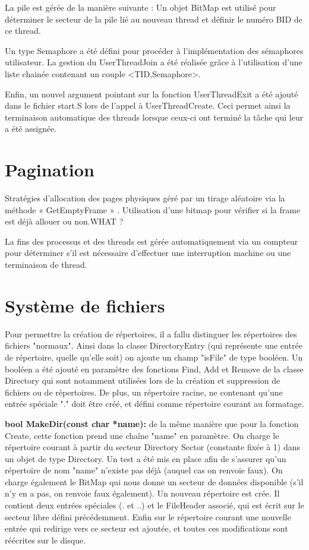 \documentclass[12pt]{report}
\begin{document}
La pile est gérée de la manière suivante :
Un objet BitMap est utilisé pour déterminer le secteur de la pile lié au nouveau thread et définir le numéro BID de ce thread.

Un type Semaphore a été défini pour procéder à l'implémentation des sémaphores utilisateur. 
La gestion du UserThreadJoin a été réalisée grâce à l'utilisation d'une liste chainée contenant un couple <TID,Semaphore>.

Enfin, un nouvel argument pointant sur la fonction UserThreadExit a été ajouté dans le fichier start.S lors de l'appel à UserThreadCreate. Ceci permet ainsi la terminaison automatique des threads lorsque ceux-ci ont terminé la tâche qui leur a été assignée.



\section{Pagination}


Stratégies d’allocation des pages physiques géré par un tirage aléatoire via la méthode « GetEmptyFrame » . Utilisation d’une bitmap pour vérifier si la frame est déjà allouer ou non.\color{red}WHAT ?\color{black}

La fins des processus et des threads est gérée automatiquement via un compteur pour déterminer s'il est nécessaire d'effectuer une interruption machine ou une terminaison de thread.

\section{Système de fichiers}

Pour permettre la création de répertoires, il a fallu distinguer les répertoires des fichiers "normaux". Ainsi dans la classe DirectoryEntry (qui représente une entrée de répertoire, quelle qu'elle soit) on ajoute un champ "isFile" de type booléen. Un booléen a été ajouté en paramètre des fonctions Find, Add et Remove de la classe Directory qui sont notamment utilisées lors de la création et suppression de fichiers ou de répertoires.
De plus, un répertoire racine, ne contenant qu'une entrée spéciale "." doit être créé, et défini comme répertoire courant au formatage.

\textbf{bool MakeDir(const char *name):} de la même manière que pour la fonction Create, cette fonction prend une chaîne "name" en paramètre. On charge le répertoire courant à partir du secteur Directory	Sector (constante fixée à 1) dans un objet de type Directory. Un test a été mis en place afin de  s'assurer qu'un répertoire de nom "name" n'existe pas déjà (auquel cas on renvoie faux). On charge également le BitMap qui nous donne un secteur de données disponible (s'il n'y en a pas, on renvoie faux également). 
Un nouveau répertoire est crée. Il contient deux entrées spéciales (. et ..) et le FileHeader associé, qui est écrit sur le secteur libre défini précédemment. Enfin sur le répertoire courant une nouvelle entrée qui redirige vers ce secteur est ajoutée, et toutes ces modifications sont réécrites sur le disque.
\bigskip
\end{document}
